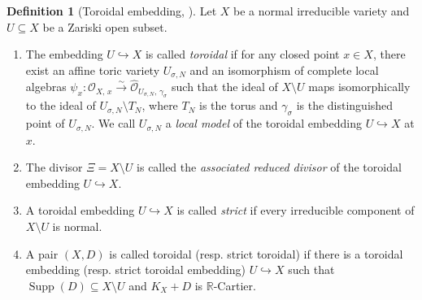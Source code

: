 \documentclass[12pt,reqno]{amsart}
\theoremstyle{definition}
\newtheorem{definition}[theorem]{Definition}
\newcommand{\on}{\operatorname}
\newcommand\cO{{\mathcal{O}}}
\newcommand\bR{{\mathbb R}}
\begin{document}
\begin{definition}[{Toroidal embedding, \cite[Chapter 2, Definition 1]{KKMS1973toroidal}}]
    Let $X$ be a normal irreducible variety and $U\subseteq X$ be a Zariski open subset. 
    \begin{enumerate}
        \item The embedding $U\hookrightarrow X$ is called \emph{toroidal} if for any closed point $x\in X$, there exist an affine toric variety $U_{\sigma,N}$ and an isomorphism of complete local algebras $\psi_x\colon \widehat{\cO}_{X,\,x} \xrightarrow{\sim} \widehat{\cO}_{U_{\sigma,N},\,\gamma_\sigma}$ such that the ideal of $X\setminus U$ maps isomorphically to the ideal of $U_{\sigma,N}\setminus T_N$, where $T_N$ is the torus and $\gamma_\sigma$ is the distinguished point of $U_{\sigma,N}$. We call $U_{\sigma,N}$ a \emph{local model} of the toroidal embedding $U\hookrightarrow X$ at $x$.
        \item The divisor $\Xi=X\setminus U$ is called the \emph{associated reduced divisor} of the toroidal embedding $U\hookrightarrow X$. 
        \item A toroidal embedding $U\hookrightarrow X$ is called \emph{strict} if every irreducible component of $X\setminus U$ is normal. 
        \item A pair $(X,D)$ is called toroidal (resp. strict toroidal) if there is a toroidal embedding (resp. strict toroidal embedding) $U\hookrightarrow X$ such that $\on{Supp}(D)\subseteq X\setminus U$ and $K_X+D$ is $\bR$-Cartier.    
    \end{enumerate}
\end{definition}
\end{document}
